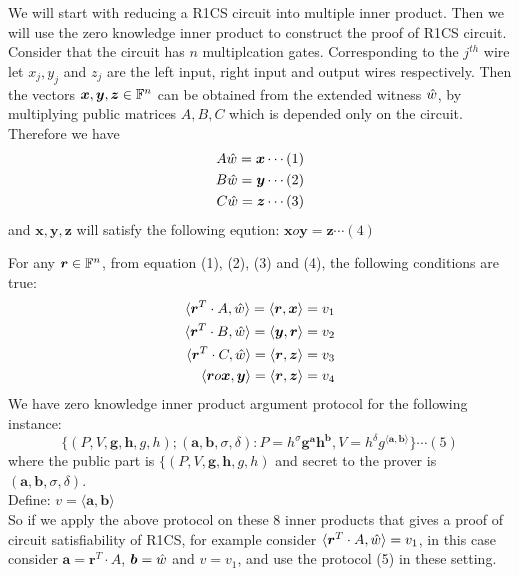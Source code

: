 We will start with reducing a R1CS circuit into multiple inner product. Then we will use the zero knowledge inner product to construct the proof of R1CS circuit. Consider that the circuit has $n$ multiplcation gates. Corresponding to the $j^{th}$ wire let $x_j, y_j$ and $z_j$ are the left input, right input and output wires respectively. Then the vectors $\bm{x}, \bm{y}, \bm{z}\in \mathbb{F}^n$ can be obtained from the extended witness $\hat{w}$, by multiplying public matrices $A, B, C$ which is depended only on the circuit. Therefore we have 
\begin{align*}
A \hat{w} = \bm{x} \cdots (1)\\
B \hat{w} = \bm{y} \cdots (2)\\
C \hat{w} = \bm{z} \cdots (3)
\end{align*}
and $\bm{x}, \bm{y}, \bm{z}$ will satisfy the following eqution: $\bm{x} o \bm{y} =\bm{z} \cdots (4)$ 

For any $\bm{r}\in \mathbb{F}^n$, from equation (1), (2), (3) and (4), the following conditions are true:
\begin{align*}
\langle \bm{r}^T \cdot A, \hat{w} \rangle = \langle \bm{r}, \bm{x} \rangle = v_1 \\
\langle \bm{r}^T \cdot B, \hat{w} \rangle = \langle \bm{y}, \bm{r} \rangle = v_2 \\
\langle \bm{r}^T \cdot C, \hat{w} \rangle = \langle \bm{r}, \bm{z} \rangle = v_3 \\
\langle \bm{r} o \bm{x}, \bm{y} \rangle = \langle \bm{r}, \bm{z} \rangle = v_4 \\
\end{align*} 
We have zero knowledge inner product argument protocol for the following instance:\\
$$\{(P,V,\bm{g},\bm{h},g,h);(\bm{a},\bm{b},\sigma,\delta): P=h^{\sigma}\bm{g}^{\bm{a}}\bm{h}^{\bm{b}}, V=h^{\delta}g^{\langle \bm{a},\bm{b}\rangle}\} \cdots (5)$$
where the public part is $\{(P,V,\bm{g},\bm{h},g,h)$ and secret to the prover is $(\bm{a},\bm{b},\sigma,\delta)$.\\
Define: $v=\langle \bm{a},\bm{b}\rangle$\\
So if we apply the above protocol on these 8 inner products that gives a proof of circuit satisfiability of R1CS, for example consider $\langle \bm{r}^T \cdot A, \hat{w} \rangle = v_1$, in this case consider $\bm{a}=\bm{r}^T\cdot A$, $\bm{b}=\hat{w}$ and $v=v_1$, and use the protocol (5) in these setting.\\
